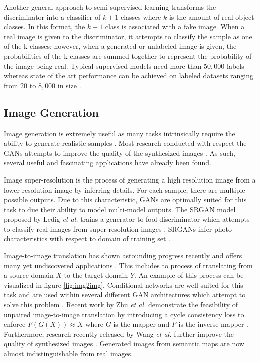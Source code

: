 \documentclass[11pt]{article}
\begin{document}
Another general approach to semi-supervised learning transforms the discriminator into a classifier of $k + 1$ classes where $k$ is the amount of real object classes. In this format, the $k + 1$ class is associated with a fake image. When a real image is given to the discriminator, it attempts to classify the sample as one of the k classes; however, when a generated or unlabeled image is given, the probabilities of the k classes are summed together to represent the probability of the image being real. Typical supervised models need more than $50,000$ labels whereas state of the art performance can be achieved on labeled datasets ranging from $20$ to $8,000$ in size \citep{2017arXiv170100160G}.

\subsection{Image Generation} \label{sec:img2img}
Image generation is extremely useful as many tasks intrinsically require the ability to generate realistic samples \citep{2017arXiv170100160G}. Most research conducted with respect the GANs attempts to improve the quality of the synthesized images \citep{2017arXiv171007035C}. As such, several useful and fascinating applications have already been found.

Image super-resolution is the process of generating a high resolution image from a lower resolution image by inferring details. For each sample, there are multiple possible outputs. Due to this characteristic, GANs are optimally suited for this task to due their ability to model multi-model outputs. The SRGAN model proposed by Ledig \textit{et al.} trains a generator to fool discriminator which attempts to classify real images from super-resolution images \citep{2016arXiv160904802L}. SRGANs infer photo characteristics with respect to domain of training set \citep{2017arXiv171007035C}.

Image-to-image translation has shown astounding progress recently and offers many yet undiscovered applications \citep{2017arXiv170100160G}. This includes to process of translating from a source domain $X$ to the target domain $Y$. An example of this process can be visualized in figure \ref{fig:img2img}. Conditional networks are well suited for this task and are used within several different GAN architectures which attempt to solve this problem \citep{2016arXiv161107004I, 2017arXiv171111585W, 2017arXiv170310593Z}. Recent work by Zhu \textit{et al.} demonstrate the feasibility of unpaired image-to-image translation by introducing a cycle consistency loss to enforce $F(G(X)) ≈ X$ where $G$ is the mapper and $F$ is the inverse mapper \citep{2017arXiv170310593Z}. Furthermore, research recently released by Wang \textit{et al.} further improve the quality of synthesized images \citep{2017arXiv171111585W}. Generated images from semantic maps are now almost indistinguishable from real images.
\end{document}

